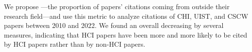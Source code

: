 We propose \xin---the proportion of papers' citations coming from outside their research field---and use this metric to analyze citations of CHI, UIST, and CSCW papers between 2010 and 2022.
We found an overall decreasing \xin by several measures, indicating that HCI papers have been more and more likely to be cited by HCI papers rather than by non-HCI papers.